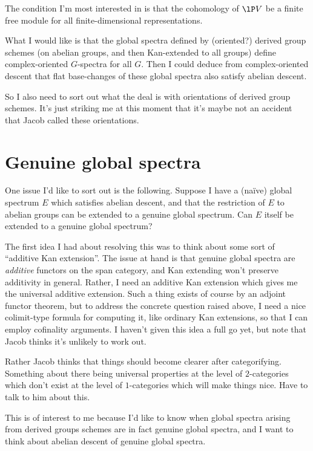 \begin{ideas}
\item The condition I'm most interested in is that the cohomology of
  $\lP V$ be a finite free module for all finite-dimensional
  representations.
\item What I would like is that the global spectra defined by
  (oriented?) derived group schemes (on abelian groups, and then
  Kan-extended to all groups) define complex-oriented $G$-spectra
  for all $G$. Then I could deduce from complex-oriented descent
  that flat base-changes of these global spectra also satisfy
  abelian descent.
\item So I also need to sort out what the deal is with orientations
  of derived group schemes. It's just striking me at this moment
  that it's maybe not an accident that Jacob called these
  orientations.
\end{ideas}


\section{Genuine global spectra}

\begin{ideas}
\item One issue I'd like to sort out is the following. Suppose I
  have a (na\"ive) global spectrum $E$ which satisfies abelian
  descent, and that the restriction of $E$ to abelian groups can be
  extended to a genuine global spectrum. Can $E$ itself be extended
  to a genuine global spectrum?

  \begin{ideas}
  \item The first idea I had about resolving this was to think
    about some sort of ``additive Kan extension''. The issue at
    hand is that genuine global spectra are \emph{additive}
    functors on the span category, and Kan extending won't
    preserve additivity in general. Rather, I need an additive Kan
    extension which gives me the universal additive
    extension. Such a thing exists of course by an adjoint functor
    theorem, but to address the concrete question raised above, I
    need a nice colimit-type formula for computing it, like
    ordinary Kan extensions, so that I can employ cofinality
    arguments. I haven't given this idea a full go yet, but note
    that Jacob thinks it's unlikely to work out.

  \item Rather Jacob thinks that things should become clearer
    after categorifying. Something about there being universal
    properties at the level of $2$-categories which don't exist at
    the level of $1$-categories which will make things nice. Have
    to talk to him about this.
  \end{ideas}
  
\item This is of interest to me because I'd like to know when global
  spectra arising from derived groups schemes are in fact genuine
  global spectra, and I want to think about abelian descent of
  genuine global spectra.
\end{ideas}

